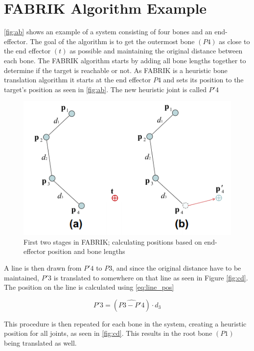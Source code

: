 \section{FABRIK Algorithm Example}
\autoref{fig:ab} shows an example of a system consisting of four bones and an end-effector. The goal of the algorithm is to get the outermost bone $ (P4) $ as close to the end effector $ (t) $ as possible and maintaining the original distance between each bone. 
The FABRIK algorithm starts by adding all bone lengths together to determine if the target is reachable or not. 
As FABRIK is a heuristic bone translation algorithm it starts at the end effector $ P4 $ and sets its position to the target's position as seen in \autoref{fig:ab}. The new heuristic joint is called $ P'4 $ 

\begin{figure}[H]
	\centering
	\includegraphics[width=\textwidth]{FABRIK/ab}
	\caption{First two stages in FABRIK; calculating positions based on end-effector position and bone lengths}
	\label{fig:ab}
\end{figure}

A line is then drawn from $ P'4 $ to $ P3 $, and since the original distance have to be maintained, $ P'3 $ is translated to somewhere on that line as seen in Figure \ref{fig:cd}. The position on the line is calculated using \autoref{eq:line_pos}

\begin{equation}\label{eq:line_pos}
	P'3 = (\hat{P3 - P'4}) \cdot d_{3}
\end{equation}


This procedure is then repeated for each bone in the system, creating a heuristic position for all joints, as seen in \autoref{fig:cd}. This results in the root bone $ (P1) $ being translated as well. 

